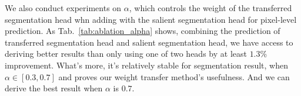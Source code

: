 \documentclass[final]{cvpr}
\begin{document}
We also conduct experiments on $\alpha$, which controls the weight of the transferred segmentation head whn adding with the salient segmentation head for pixel-level prediction. As Tab.~\ref{tab:ablation_alpha} shows, combining the prediction of transferred segmentation head and salient segmentation head, we have access to deriving better results than only using one of two heads by at least $1.3$\% improvement. What's more, it's relatively stable for segmentation result, when $\alpha \in [0.3, 0.7]$ and proves our weight transfer method's usefulness. And we can derive the best result when $\alpha$ is $0.7$.

\begin{table}[htbp]
    
\caption{Results on PASCAL val set when the weight of salient segmentation head ($\alpha$) varies.}
    \label{tab:ablation_alpha}
\end{table}



\begin{table}[htbp]
    \caption{Results on PASCAL val and COCO val when using the merging and dropping strategies or not.} 
    \centering
    \label{tab:retrainstrategies}
\end{table}
\end{document}
